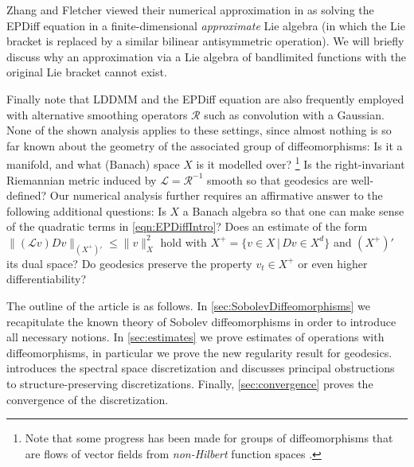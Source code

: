 \documentclass[a4paper, 12pt]{article}
\newcommand{\R}{\mathbb{R}}
\newcommand{\T}{\mathbb{T}}
\newcommand{\id}{\mathrm{id}}
\newcommand{\Riesz}{\mathcal{R}}
\renewcommand{\L}{\mathcal{L}}
\newcommand{\onesymbol}{\mathrm{I}}
\newcommand{\Id}{{\mathcal{I}}}
\begin{document}
Zhang and Fletcher viewed their numerical approximation in \cite{ZhFl19} as solving the EPDiff equation in a finite-dimensional \emph{approximate} Lie algebra
(in which the Lie bracket is replaced by a similar bilinear antisymmetric operation).
We will briefly discuss why an approximation via a Lie algebra of bandlimited functions with the original Lie bracket cannot exist.

Finally note that LDDMM and the EPDiff equation are also frequently employed with alternative smoothing operators $\Riesz$ such as convolution with a Gaussian.
None of the shown analysis applies to these settings, since almost nothing is so far known about the geometry of the associated group of diffeomorphisms:
Is it a manifold, and what (Banach) space $X$ is it modelled over?%
\footnote{Note that some progress has been made for groups of diffeomorphisms that are flows of vector fields from \emph{non-Hilbert} function spaces \cite{NeRa19}.}
Is the right-invariant Riemannian metric induced by $\L=\Riesz^{-1}$ smooth so that geodesics are well-defined?
Our numerical analysis further
requires an affirmative answer to the following additional questions:
Is $X$ a Banach algebra so that one can make sense of the quadratic terms in \eqref{eqn:EPDiffIntro}?
Does an estimate of the form $\|(\L v)Dv\|_{(X^+)'}\leq\|v\|_X^2$ hold with $X^+=\{v\in X\,|\,Dv\in X^d\}$ and $(X^+)'$ its dual space?
Do geodesics preserve the property $v_t\in X^+$ or even higher differentiability?

The outline of the article is as follows.
In \cref{sec:SobolevDiffeomorphisms} we recapitulate the known theory of Sobolev diffeomorphisms in order to introduce all necessary notions.
In \cref{sec:estimates} we prove estimates of operations with diffeomorphisms, in particular we prove the new regularity result for geodesics.
 introduces the spectral space discretization and discusses principal obstructions to structure-preserving discretizations.
Finally, \cref{sec:convergence} proves the convergence of the discretization.

\end{document}
